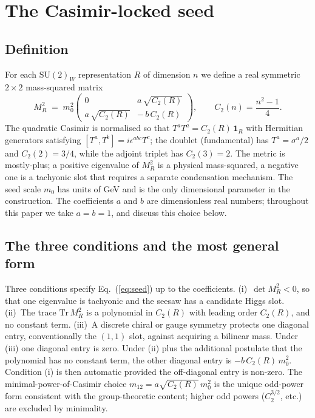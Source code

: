 \documentclass[%
 aps,
 prd,
 reprint,
 nofootinbib,
 superscriptaddress,
 amsmath,
 amssymb,
]{revtex4-2}
\begin{document}
\section{The Casimir-locked seed}\label{sec:seed}

\subsection{Definition}

For each $\mathrm{SU}(2)_W$ representation $R$ of dimension $n$ we define a real symmetric $2\times 2$ mass-squared matrix
\begin{equation}\label{eq:seed}
M_R^2 \;=\; m_0^2 \begin{pmatrix} 0 & a\,\sqrt{C_2(R)} \\ a\,\sqrt{C_2(R)} & -\,b\,C_2(R)\end{pmatrix},\qquad C_2(n)=\frac{n^2-1}{4}.
\end{equation}
The quadratic Casimir is normalised so that $T^a T^a = C_2(R)\,\mathbf{1}_R$ with Hermitian generators satisfying $[T^a,T^b]=i\epsilon^{abc}T^c$; the doublet (fundamental) has $T^a=\sigma^a/2$ and $C_2(2)=3/4$, while the adjoint triplet has $C_2(3)=2$. The metric is mostly-plus; a positive eigenvalue of $M_R^2$ is a physical mass-squared, a negative one is a tachyonic slot that requires a separate condensation mechanism. The seed scale $m_0$ has units of GeV and is the only dimensional parameter in the construction. The coefficients $a$ and $b$ are dimensionless real numbers; throughout this paper we take $a=b=1$, and discuss this choice below.

\subsection{The three conditions and the most general form}

Three conditions specify Eq.~(\ref{eq:seed}) up to the coefficients. (i)~$\det M_R^2 < 0$, so that one eigenvalue is tachyonic and the seesaw has a candidate Higgs slot. (ii)~The trace $\mathrm{Tr}\,M_R^2$ is a polynomial in $C_2(R)$ with leading order $C_2(R)$, and no constant term. (iii)~A discrete chiral or gauge symmetry protects one diagonal entry, conventionally the $(1,1)$ slot, against acquiring a bilinear mass. Under (iii) one diagonal entry is zero. Under (ii) plus the additional postulate that the polynomial has no constant term, the other diagonal entry is $-b\,C_2(R)\,m_0^2$. Condition (i) is then automatic provided the off-diagonal entry is non-zero. The minimal-power-of-Casimir choice $m_{12}=a\sqrt{C_2(R)}\,m_0^2$ is the unique odd-power form consistent with the group-theoretic content; higher odd powers ($C_2^{3/2}$, etc.) are excluded by minimality.
\end{document}
